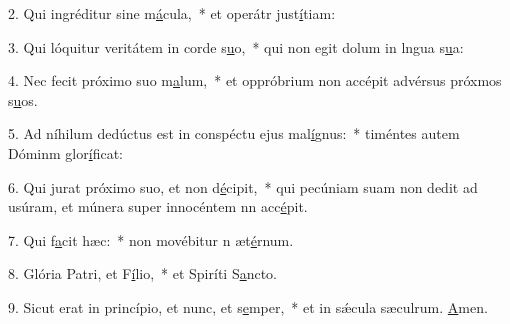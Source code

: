 2. Qui ingréditur sine m\uline{á}cula,~* et operátr just\uline{í}tiam:\par 
3. Qui lóquitur veritátem in corde s\uline{u}o,~* qui non egit dolum in lngua s\uline{u}a:\par 
4. Nec fecit próximo suo m\uline{a}lum,~* et oppróbrium non accépit advérsus próxmos s\uline{u}os.\par 
5. Ad níhilum dedúctus est in conspéctu ejus mal\uline{í}gnus:~* timéntes autem Dóminm glor\uline{í}ficat:\par 
6. Qui jurat próximo suo, et non d\uline{é}cipit,~* qui pecúniam suam non dedit ad usúram, et múnera super innocéntem nn acc\uline{é}pit.\par 
7. Qui f\uline{a}cit hæc:~* non movébitur n æt\uline{é}rnum.\par 
8. Glória Patri, et F\uline{í}lio,~* et Spiríti S\uline{a}ncto.\par 
9. Sicut erat in princípio, et nunc, et s\uline{e}mper,~* et in sǽcula sæculrum. \uline{A}men.\par 
